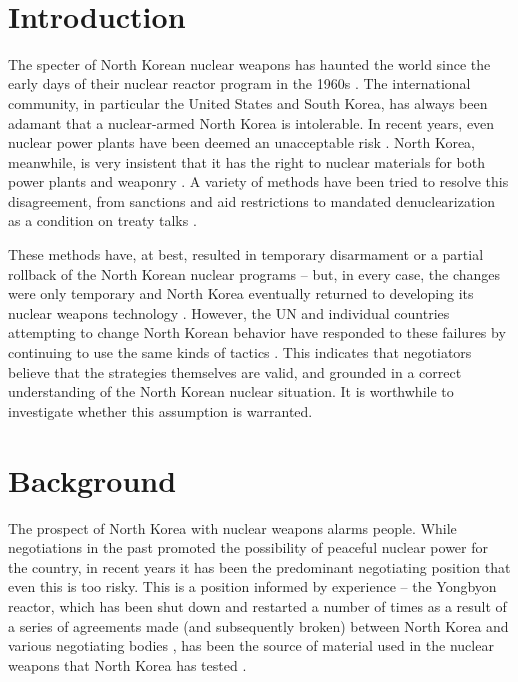 \documentclass[titlepage]{article}
\begin{document}
\newpage
\thispagestyle{empty}
       \addtocounter{page}{-1}
       \null
\ \newpage


\section{Introduction}
The specter of North Korean nuclear weapons has haunted the world since the early days of their nuclear reactor program in the 1960s \cite{pincus}. The international community, in particular the United States and South Korea, has always been adamant that a nuclear-armed North Korea is intolerable. In recent years, even nuclear power plants have been deemed an unacceptable risk \cite{kerry,lee}. North Korea, meanwhile, is very insistent that it has the right to nuclear materials for both power plants and weaponry \cite{kcna}. A variety of methods have been tried to resolve this disagreement, from sanctions and aid restrictions to mandated denuclearization as a condition on treaty talks \cite{bajoria,davenport}.

These methods have, at best, resulted in temporary disarmament or a partial rollback of the North Korean nuclear programs – but, in every case, the changes were only temporary and North Korea eventually returned to developing its nuclear weapons technology \cite{davenport,nti15,iaea09}. However, the UN and individual countries attempting to change North Korean behavior have responded to these failures by continuing to use the same kinds of tactics \cite{davenport,nti15}. This indicates that negotiators believe that the strategies themselves are valid, and grounded in a correct understanding of the North Korean nuclear situation. It is worthwhile to investigate whether this assumption is warranted.

\section{Background}
The prospect of North Korea with nuclear weapons alarms people. While negotiations in the past promoted the possibility of peaceful nuclear power for the country, in recent years it has been the predominant negotiating position that even this is too risky. This is a position informed by experience – the Yongbyon reactor, which has been shut down and restarted a number of times as a result of a series of agreements made (and subsequently broken) between North Korea and various negotiating bodies \cite{bajoria,davenport}, has been the source of material used in the nuclear weapons that North Korea has tested \cite{hecker}.
\end{document}
